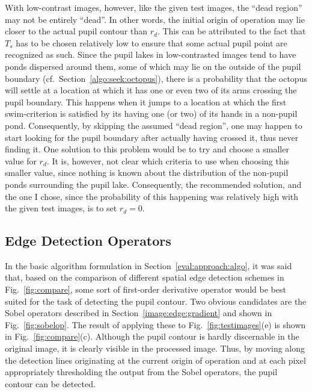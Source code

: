 With low-contrast images, however, like the given test images, the
``dead region'' may not be entirely ``dead''.  In other words, the
initial origin of operation may lie closer to the actual pupil contour
than $r_{d}$.  This can be attributed to the fact that $T_{s}$ has to
be chosen relatively low to ensure that some actual pupil point are
recognized as such.  Since the pupil lakes in low-contrasted images
tend to have ponds dispersed around them, some of which may lie on the
outside of the pupil boundary (cf.\ Section~\ref{algo:seek:octopus}),
there is a probability that the octopus will settle at a location at
which it has one or even two of its arms crossing the pupil boundary.
This happens when it jumps to a location at which the first
swim-criterion is satisfied by its having one (or two) of its hands in
a non-pupil pond.  Consequently, by skipping the assumed ``dead
region'', one may happen to start looking for the pupil boundary after
actually having crossed it, thus never finding it.  One solution to
this problem would be to try and choose a smaller value for $r_{d}$.
It is, however, not clear which criteria to use when choosing this
smaller value, since nothing is known about the distribution of the
non-pupil ponds surrounding the pupil lake.  Consequently, the
recommended solution, and the one I chose, since the probability of
this happening was relatively high with the given test images, is to
set $r_{d}=0$.


\subsection{Edge Detection Operators}
\label{algo:pos:operators}

In the basic algorithm formulation in
Section~\ref{eval:approach:algo}, it was said that, based on the
comparison of different spatial edge detection schemes in
Fig.~\ref{fig:compare}, some sort of first-order derivative operator
would be best suited for the task of detecting the pupil contour.  Two
obvious candidates are the Sobel operators described in
Section~\ref{image:edge:gradient} and shown in Fig.~\ref{fig:sobelop}.
The result of applying these to Fig.~\ref{fig:testimages}(e) is shown
in Fig.~\ref{fig:compare}(c).  Although the pupil contour is hardly
discernable in the original image, it is clearly visible in the
processed image.  Thus, by moving along the detection lines
originating at the current origin of operation and at each pixel
appropriately thresholding the output from the Sobel operators, the
pupil contour can be detected.

